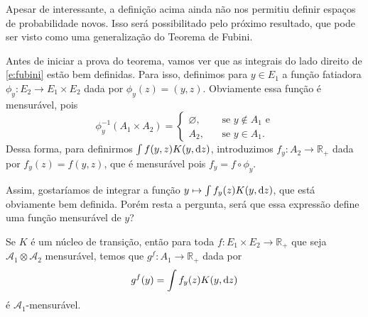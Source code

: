 Apesar de interessante, a definição acima ainda não nos permitiu definir espaços de probabilidade novos.
Isso será possibilitado pelo próximo resultado, que pode ser visto como uma generalização do Teorema de Fubini.


Antes de iniciar a prova do teorema, vamos ver que as integrais do lado direito de \eqref{e:fubini} estão bem definidas.
Para isso, definimos para $y \in E_1$ a função fatiadora $\phi_y: E_2 \to E_1 \times E_2$ dada por $\phi_y(z) = (y, z)$.
Obviamente essa função é mensurável, pois
\begin{equation}
  \phi_y^{-1}(A_1 \times A_2) =
  \begin{cases}
    \varnothing, \quad & \text{ se $y \not \in A_1$ e}\\
    A_2, & \text{ se $y \in A_1$}.
  \end{cases}
\end{equation}
Dessa forma, para definirmos $\int f(y,z) K(y, \mathop{}\!\mathrm{d} z)$, introduzimos $f_y: A_2 \to \mathbb{R}_+$ dada por $f_y(z) = f(y,z)$, que é mensurável pois $f_y = f \circ \phi_y$.

Assim, gostaríamos de integrar a função $y \mapsto \int f_y(z) K(y, \mathop{}\!\mathrm{d} z)$, que está obviamente bem definida.
Porém resta a pergunta, será que essa expressão define uma função mensurável de $y$?

\begin{lemma}
  Se $K$ é um núcleo de transição, então para toda $f: E_1 \times E_2 \to \mathbb{R}_+$ que seja $\mathcal{A}_1 \otimes \mathcal{A}_2$ mensurável, temos que $g^f:A_1 \to \mathbb{R}_+$ dada por
  \begin{equation}
    g^f(y) = \int f_y(z) K(y, \mathop{}\!\mathrm{d} z)
  \end{equation}
  é $\mathcal{A}_1$-mensurável.
\end{lemma}


